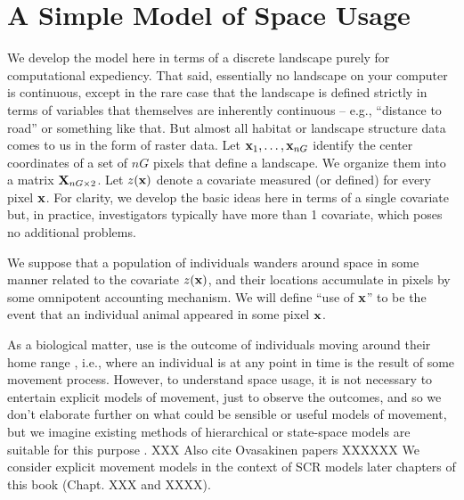 \section{A Simple Model of Space Usage}
\label{rsf.sec.rsfmodel}

We develop the model here in terms of a discrete landscape purely for
computational expediency. That said, essentially no landscape on your
computer is continuous, except in the rare case that the landscape is
defined strictly in terms of variables that themselves are inherently
continuous -- e.g., ``distance to road'' or something like that.  But
almost all habitat or landscape structure data comes to us in the form
of raster data.  Let ${\bf x}_{1},\ldots,{\bf x}_{nG}$ identify the
center coordinates of a set of $nG$ pixels that define a landscape.
We organize them into a matrix ${\bf X}_{nG \times 2}$.  Let $z({\bf
  x})$ denote a covariate measured (or defined) for every pixel ${\bf
  x}$. For clarity, we develop the basic ideas here in terms of a
single covariate but, in practice, investigators typically have more
than 1 covariate, which poses no additional problems.

We suppose that a population of individuals wanders around space in
some manner related to the covariate $z({\bf x})$, and their locations
accumulate in pixels by some omnipotent accounting mechanism. We will
define ``use of ${\bf x}$'' to be the event that an individual animal
appeared in some pixel ${\bf x}$. 


 As a biological matter,
use is the outcome of individuals moving around their home range \citep{hooten_etal:2010},
i.e., where an individual is at any point in time is the result of
some movement process. However, to understand space usage, it is not
necessary to entertain explicit models of movement, just to observe
the outcomes, and so we don't elaborate further on what could be
sensible or useful models of movement, but we imagine existing methods
of hierarchical or state-space
models are suitable for this purpose \citep{jonsen_etal:2005,
  forester_etal:2007, patterson_etal:2008, hooten_etal:2010,
  mcclintock_etal:2012}.
XXX Also cite Ovasakinen papers XXXXXX
We consider explicit movement models in the context of SCR models
later chapters of this book
(Chapt. XXX and XXXX).


